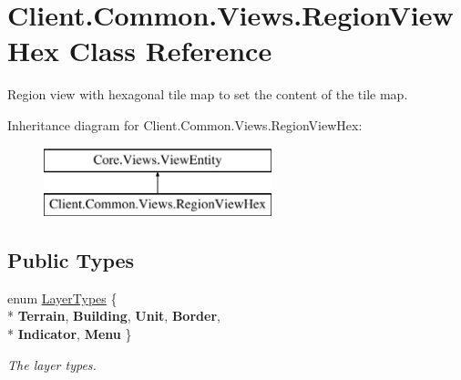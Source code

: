 \hypertarget{classClient_1_1Common_1_1Views_1_1RegionViewHex}{}\section{Client.\+Common.\+Views.\+Region\+View\+Hex Class Reference}
\label{classClient_1_1Common_1_1Views_1_1RegionViewHex}


Region view with hexagonal tile map to set the content of the tile map.  


Inheritance diagram for Client.\+Common.\+Views.\+Region\+View\+Hex\+:\begin{figure}[H]
\begin{center}
\leavevmode
\includegraphics[height=2.000000cm]{classClient_1_1Common_1_1Views_1_1RegionViewHex}
\end{center}
\end{figure}
\subsection*{Public Types}
\begin{DoxyCompactItemize}
\item 
enum \hyperlink{classClient_1_1Common_1_1Views_1_1RegionViewHex_a12e481b76f5d2aae6defc25692a677f7}{Layer\+Types} \{ \\*
{\bfseries Terrain}, 
{\bfseries Building}, 
{\bfseries Unit}, 
{\bfseries Border}, 
\\*
{\bfseries Indicator}, 
{\bfseries Menu}
 \}\begin{DoxyCompactList}\small\item\em The layer types. \end{DoxyCompactList}
\end{DoxyCompactItemize}
